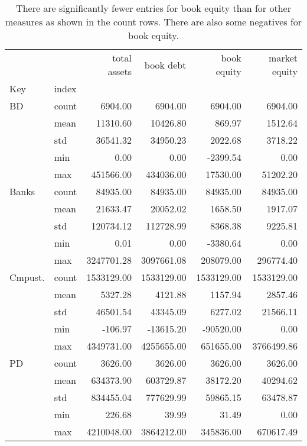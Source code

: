 \begin{table}
\caption{
    There are significantly fewer entries for book equity
    than for other measures as shown in the count rows.
    There are also some negatives for book equity.
    }
\label{tab:Table 2.1}
\begin{tabular}{llrrrr}
\toprule
 &  & total assets & book debt & book equity & market equity \\
Key & index &  &  &  &  \\
\midrule
{BD} & count & 6904.00 & 6904.00 & 6904.00 & 6904.00 \\
 & mean & 11310.60 & 10426.80 & 869.97 & 1512.64 \\
 & std & 36541.32 & 34950.23 & 2022.68 & 3718.22 \\
 & min & 0.00 & 0.00 & -2399.54 & 0.00 \\
 & max & 451566.00 & 434036.00 & 17530.00 & 51202.20 \\
\cline{1-6}
{Banks} & count & 84935.00 & 84935.00 & 84935.00 & 84935.00 \\
 & mean & 21633.47 & 20052.02 & 1658.50 & 1917.07 \\
 & std & 120734.12 & 112728.99 & 8368.38 & 9225.81 \\
 & min & 0.01 & 0.00 & -3380.64 & 0.00 \\
 & max & 3247701.28 & 3097661.08 & 208079.00 & 296774.40 \\
\cline{1-6}
{Cmpust.} & count & 1533129.00 & 1533129.00 & 1533129.00 & 1533129.00 \\
 & mean & 5327.28 & 4121.88 & 1157.94 & 2857.46 \\
 & std & 46501.54 & 43345.09 & 6277.02 & 21566.11 \\
 & min & -106.97 & -13615.20 & -90520.00 & 0.00 \\
 & max & 4349731.00 & 4255655.00 & 651655.00 & 3766499.86 \\
\cline{1-6}
{PD} & count & 3626.00 & 3626.00 & 3626.00 & 3626.00 \\
 & mean & 634373.90 & 603729.87 & 38172.20 & 40294.62 \\
 & std & 834455.04 & 777629.99 & 59865.15 & 63478.87 \\
 & min & 226.68 & 39.99 & 31.49 & 0.00 \\
 & max & 4210048.00 & 3864212.00 & 345836.00 & 670617.49 \\
\cline{1-6}
\bottomrule
\end{tabular}
\end{table}

